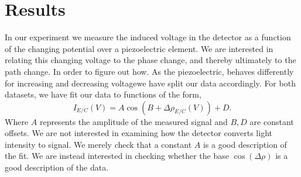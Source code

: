 \documentclass[working, oneside]{inputs/tuftebook}
\begin{document}
\section*{Results}
In our experiment we measure the induced voltage in the detector as a function of the changing potential over a piezoelectric element. We are interested in relating this changing voltage to the phase change, and thereby ultimately to the path change. In order to figure out how. As the piezoelectric, behaves differently for increasing and decreasing voltagewe have split our data accordingly. For both datasets, we have fit our data to functions of the form,
\[
	I_{E /C} \left( V \right) = A \cos \left( B + \Delta \rho_{E /C}\left( V \right)  \right) +D
.\] 
Where $A$ represents the amplitude of the measured signal and $B, D$ are constant offsets. We are not interested in examining how the detector converts light intensity to signal. We merely check that a constant $A$ is a good description of the fit. We are instead interested in checking whether the base $\cos\left( \Delta \rho  \right) $ is a good description of the data. 
\end{document}
